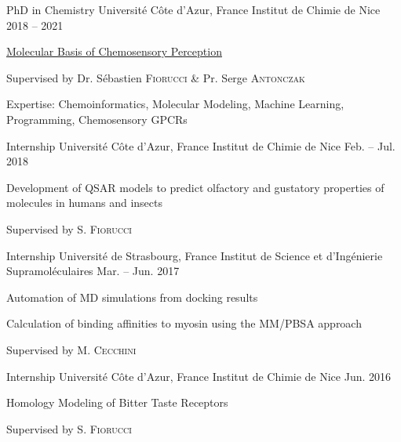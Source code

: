\vspace{-1em}

\begin{minipage}[t]{.49\linewidth}
% 
    \begin{cventries}
% 
        \cventryvar
            {PhD in Chemistry}
            {Université Côte d'Azur, France}
            {Institut de Chimie de Nice}
            {2018 -- 2021}
            {
            \begin{cvitems}
                \item{\href{https://www.theses.fr/2021COAZ4062}{Molecular Basis of Chemosensory Perception}}
                \item{Supervised by Dr. Sébastien \textsc{Fiorucci} \& Pr. Serge \textsc{Antonczak}}
                \item{Expertise: Chemoinformatics, Molecular Modeling, Machine Learning, Programming, Chemosensory GPCRs}
            \end{cvitems}
            }
% 
        \cventryvar
            {Internship}
            {Université Côte d'Azur, France}
            {Institut de Chimie de Nice}
            {Feb. -- Jul. 2018}
            {
            \begin{cvitems}
                \item{Development of QSAR models to predict olfactory and gustatory \mbox{properties} of molecules in humans and insects}
                \item{Supervised by S. \textsc{Fiorucci}}
            \end{cvitems}
            }

        \cventryvar
            {Internship}
            {Université de Strasbourg, France}
            {Institut de Science et d'Ingénierie Supramoléculaires}
            {Mar. -- Jun. 2017}
            {
            \begin{cvitems}
                \item{Automation of MD simulations from docking results}
                \item{Calculation of binding affinities to myosin using the MM/PBSA \mbox{approach}}
                \item{Supervised by M. \textsc{Cecchini}}
            \end{cvitems}
            }
% 
        \cventryvar
            {Internship}
            {Université Côte d'Azur, France}
            {Institut de Chimie de Nice}
            {Jun. 2016}
            {
            \begin{cvitems}
                \item{Homology Modeling of Bitter Taste Receptors}
                \item{Supervised by S. \textsc{Fiorucci}}
            \end{cvitems}
            }
% 
    \end{cventries}
% 
\end{minipage}
